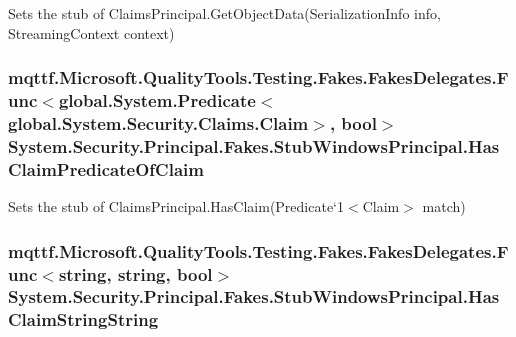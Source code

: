 Sets the stub of Claims\-Principal.\-Get\-Object\-Data(\-Serialization\-Info info, Streaming\-Context context)

\hypertarget{class_system_1_1_security_1_1_principal_1_1_fakes_1_1_stub_windows_principal_a8b7164d9262054b0d817a6213723ff84}{
\subsubsection[{Has\-Claim\-Predicate\-Of\-Claim}]{\setlength{\rightskip}{0pt plus 5cm}mqttf.\-Microsoft.\-Quality\-Tools.\-Testing.\-Fakes.\-Fakes\-Delegates.\-Func$<$global.\-System.\-Predicate$<$global.\-System.\-Security.\-Claims.\-Claim$>$, bool$>$ System.\-Security.\-Principal.\-Fakes.\-Stub\-Windows\-Principal.\-Has\-Claim\-Predicate\-Of\-Claim}}\label{class_system_1_1_security_1_1_principal_1_1_fakes_1_1_stub_windows_principal_a8b7164d9262054b0d817a6213723ff84}


Sets the stub of Claims\-Principal.\-Has\-Claim(Predicate`1$<$Claim$>$ match)

\hypertarget{class_system_1_1_security_1_1_principal_1_1_fakes_1_1_stub_windows_principal_ab8717b9d34aff5e4708415c33baef074}{
\subsubsection[{Has\-Claim\-String\-String}]{\setlength{\rightskip}{0pt plus 5cm}mqttf.\-Microsoft.\-Quality\-Tools.\-Testing.\-Fakes.\-Fakes\-Delegates.\-Func$<$string, string, bool$>$ System.\-Security.\-Principal.\-Fakes.\-Stub\-Windows\-Principal.\-Has\-Claim\-String\-String}}\label{class_system_1_1_security_1_1_principal_1_1_fakes_1_1_stub_windows_principal_ab8717b9d34aff5e4708415c33baef074}


